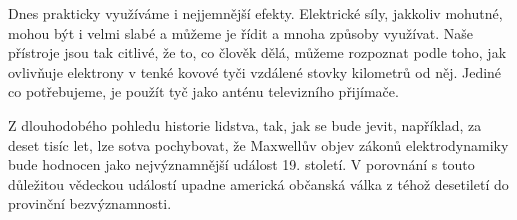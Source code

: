     Dnes prakticky využíváme i nejjemnější efekty. Elektrické síly, jakkoliv mohutné, mohou být i 
    velmi slabé a můžeme je řídit a mnoha způsoby využívat. Naše přístroje jsou tak citlivé, že to, 
    co člověk dělá, můžeme rozpoznat podle toho, jak ovlivňuje elektrony v tenké kovové tyči 
    vzdálené stovky kilometrů od něj. Jediné co potřebujeme, je použít tyč jako anténu televizního 
    přijímače.

    Z dlouhodobého pohledu historie lidstva, tak, jak se bude jevit, například, za deset tisíc let, 
    lze sotva pochybovat, že Maxwellův objev zákonů elektrodynamiky bude hodnocen jako 
    nejvýznamnější událost 19. století. V porovnání s touto důležitou vědeckou událostí upadne 
    americká občanská válka z téhož desetiletí do provinční bezvýznamnosti.